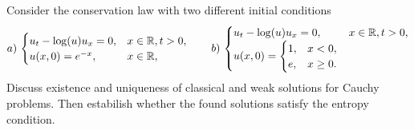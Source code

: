 \newpage
\begin{exercise}
    Consider the conservation law with two different initial conditions
    \begin{equation*}
        a)\,\begin{cases}
            u_t - \log(u) u_x = 0, & x \in \mathbb{R}, t > 0, \\
            u(x,0) = e^{-x},       & x \in \mathbb{R},
        \end{cases}
        \qquad
        b)\,\begin{cases}
            u_t - \log(u) u_x = 0, & x \in \mathbb{R}, t > 0, \\
            u(x,0) = \begin{cases}
                         1, & x < 0,    \\
                         e, & x \geq 0.
                     \end{cases}
        \end{cases}
    \end{equation*}
    Discuss existence and uniqueness of classical and weak solutions for Cauchy problems. Then estabilish whether the found solutions satisfy the entropy condition.
\end{exercise}
